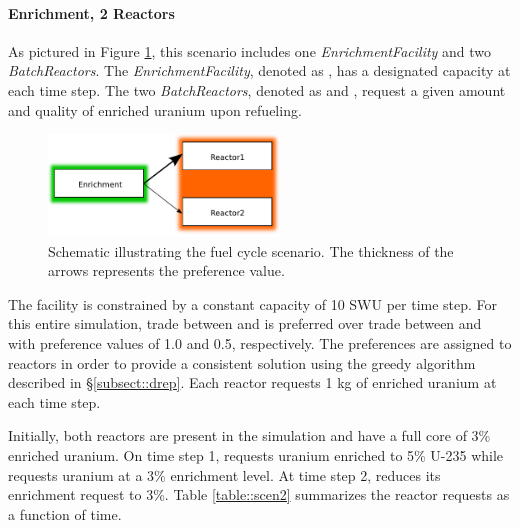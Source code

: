 \paragraph{Enrichment, 2 Reactors}

As pictured in Figure \ref{fig::fc2}, this scenario includes
one \textit{EnrichmentFacility} and
two \textit{BatchReactors}. The \textit{EnrichmentFacility}, denoted
as \Enrichment{}, has a designated capacity at each time step. The
two \textit{BatchReactors}, denoted as  and , request a
given amount and quality of enriched uranium upon refueling.

\begin{figure}
  \begin{center}
    \includegraphics[width=0.55\textwidth]{./figs/fc2.pdf}
    \caption[]{\label{fig::fc2}
        Schematic illustrating the fuel cycle scenario. The thickness of the arrows represents the preference value.}
  \end{center}
\end{figure}

The \Enrichment{} facility is constrained by a constant capacity of 10 SWU per
time step. For this entire simulation, trade between \Enrichment{}
and  is preferred over trade between \Enrichment{} and 
with preference values of 1.0 and 0.5, respectively. The preferences are
assigned to reactors in order to provide a consistent solution using the greedy
algorithm described in \S \ref{subsect::drep}. Each reactor requests 1 kg of
enriched uranium at each time step.

Initially, both reactors are present in the simulation and have a full core of
3\% enriched uranium. On time step 1,  requests uranium enriched to
5\% U-235 while  requests uranium at a 3\% enrichment level. At time
step 2,  reduces its enrichment request to
3\%. Table \ref{table::scen2} summarizes the reactor requests as a function of
time.

